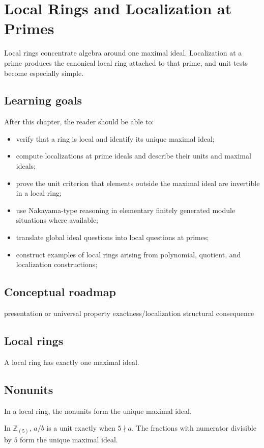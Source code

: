 \chapter{Local Rings and Localization at Primes}
\label{ch:v08}

Local rings concentrate algebra around one maximal ideal. Localization at a prime produces the canonical local ring attached to that prime, and unit tests become especially simple.

\section*{Learning goals}
After this chapter, the reader should be able to:
\begin{itemize}
\item verify that a ring is local and identify its unique maximal ideal;
\item compute localizations at prime ideals and describe their units and maximal ideals;
\item prove the unit criterion that elements outside the maximal ideal are invertible in a local ring;
\item use Nakayama-type reasoning in elementary finitely generated module situations where available;
\item translate global ideal questions into local questions at primes;
\item construct examples of local rings arising from polynomial, quotient, and localization constructions;
\end{itemize}
\section*{Conceptual roadmap}
\volroadmap
  {presentation or universal property}
  {exactness/localization}
  {structural consequence}

\section{Local rings}
A local ring has exactly one maximal ideal.

\section{Nonunits}
In a local ring, the nonunits form the unique maximal ideal.

\begin{example}\label{ex:v08-expand-01}
In $\mathbb Z_{(5)}$, $a/b$ is a unit exactly when $5\nmid a$. The fractions with numerator divisible by $5$ form the unique maximal ideal.
\end{example}

